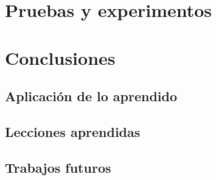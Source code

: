 \documentclass[a4paper, 12pt]{book}
\begin{document}

\cleardoublepage
\chapter{Pruebas y experimentos}
\label{chap:pruebas-experimentos}


\cleardoublepage
\chapter{Conclusiones}
\label{chap:conclusiones}


\section{Aplicación de lo aprendido}
\label{sec:aplicacion}



\section{Lecciones aprendidas}
\label{sec:lecciones_aprendidas}


\section{Trabajos futuros}
\label{sec:trabajos_futuros}


\cleardoublepage


 
\end{document}
